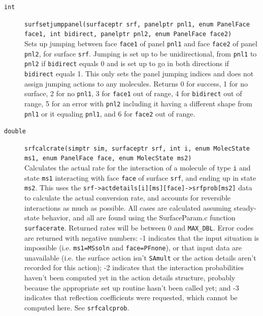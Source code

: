 \documentclass {scrbook}
\newcommand {\ttt} {\texttt}
\begin{document}
\begin{description}
\item[\ttt{int}]
\ttt{surfsetjumppanel(surfaceptr srf, panelptr pnl1, enum PanelFace face1, int bidirect, panelptr pnl2, enum PanelFace face2)}
\hfill \\
Sets up jumping between face \ttt{face1} of panel \ttt{pnl1} and face \ttt{face2} of panel \ttt{pnl2}, for surface \ttt{srf}. Jumping is set up to be unidirectional, from \ttt{pnl1} to \ttt{pnl2} if \ttt{bidirect} equals 0 and is set up to go in both directions if \ttt{bidirect} equals 1. This only sets the panel jumping indices and does not assign jumping actions to any molecules. Returns 0 for success, 1 for no surface, 2 for no \ttt{pnl1}, 3 for \ttt{face1} out of range, 4 for \ttt{bidirect} out of range, 5 for an error with \ttt{pnl2} including it having a different shape from \ttt{pnl1} or it equaling \ttt{pnl1}, and 6 for \ttt{face2} out of range.

\item[\ttt{double}]
\ttt{srfcalcrate(simptr sim, surfaceptr srf, int i, enum MolecState ms1, enum PanelFace face, enum MolecState ms2)}
\hfill \\
Calculates the actual rate for the interaction of a molecule of type \ttt{i} and state \ttt{ms1} interacting with face \ttt{face} of surface \ttt{srf}, and ending up in state \ttt{ms2}. This uses the \ttt{srf->actdetails[i][ms][face]->srfprob[ms2]} data to calculate the actual conversion rate, and accounts for reversible interactions as much as possible. All cases are calculated assuming steady-state behavior, and all are found using the SurfaceParam.c function \ttt{surfacerate}. Returned rates will be between 0 and \ttt{MAX\_DBL}. Error codes are returned with negative numbers: -1 indicates that the input situation is impossible (i.e. \ttt{ms1=MSsoln} and \ttt{face=PFnone}), or that input data are unavailable (i.e. the surface action isn't \ttt{SAmult} or the action details aren't recorded for this action); -2 indicates that the interaction probabilities haven't been computed yet in the action details structure, probably because the appropriate set up routine hasn't been called yet; and -3 indicates that reflection coefficients were requested, which cannot be computed here. See \ttt{srfcalcprob}.


\end{description}
\end{document}
